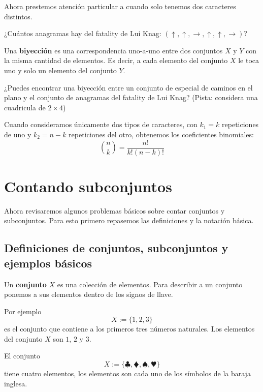 Ahora prestemos atención particular a cuando solo tenemos dos caracteres distintos. 

\begin{ejercicio}
¿Cuántos anagramas hay del fatality de Lui Knag: $(\uparrow,\uparrow,\rightarrow,\uparrow,\uparrow,\rightarrow)$?
\end{ejercicio}
\vspace{1cm}

Una {\bf biyección} es una correspondencia uno-a-uno entre dos conjuntos $X$ y $Y$ con la misma cantidad de elementos. Es decir, a cada elemento del conjunto $X$ le toca uno y solo un elemento del conjunto $Y$.

\begin{ejercicio}
¿Puedes encontrar una biyección entre un conjunto de especial de caminos en el plano y el conjunto de anagramas del fatality de Lui Knag? (Pista: considera una cuadricula de $2 \times 4$)
\end{ejercicio}
\vspace{3cm}

Cuando consideramos únicamente dos tipos de caracteres, con $k_1=k$ repeticiones de uno y $k_2= n-k$ repeticiones del otro, obtenemos los coeficientes binomiales:
$${n\choose k}=\frac{n!}{k!(n-k)!}$$

\section{Contando subconjuntos}

Ahora revisaremos algunos problemas básicos sobre contar conjuntos y subconjuntos. Para esto primero repasemos las definiciones y la notación básica.

\subsection{Definiciones de conjuntos, subconjuntos y ejemplos básicos}

Un {\bf conjunto} $X$ es una colección de elementos. Para describir a un conjunto ponemos a sus elementos dentro de los signos de llave.

Por ejemplo $$X:=\{1,2,3 \}$$ es el conjunto que contiene a los primeros tres números naturales. Los elementos del conjunto $X$ son $1$, $2$ y $3$.

El conjunto $$X:=\{\clubsuit,\vardiamondsuit,\spadesuit,\varheartsuit\}$$ tiene cuatro elementos, los elementos son cada uno de los símbolos de la baraja inglesa.

